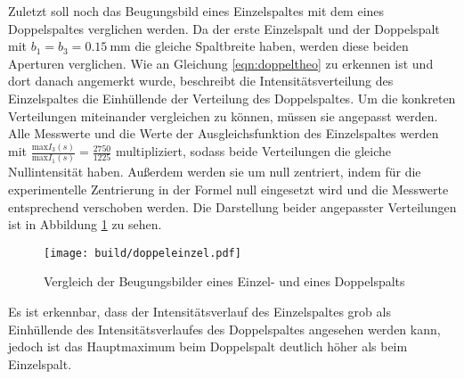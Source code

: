 Zuletzt soll noch das Beugungsbild eines Einzelspaltes mit dem eines Doppelspaltes
verglichen werden. Da der erste Einzelspalt und der Doppelspalt mit $b_1 = b_3 = \SI{0.15}{\milli\meter}$
die gleiche Spaltbreite haben, werden diese beiden Aperturen verglichen.
Wie an Gleichung \eqref{eqn:doppeltheo} zu erkennen ist und dort danach angemerkt
wurde, beschreibt die Intensitätsverteilung des Einzelspaltes die Einhüllende
der Verteilung des Doppelspaltes. Um die konkreten Verteilungen miteinander vergleichen
zu können, müssen sie angepasst werden. Alle Messwerte und die Werte der Ausgleichsfunktion
des Einzelspaltes werden mit $\frac{\text{max} I_3(s)}{\text{max} I_1(s)} = \frac{2750}{1225}$
multipliziert, sodass beide Verteilungen die gleiche Nullintensität haben. Außerdem
werden sie um null zentriert, indem für die experimentelle Zentrierung in der Formel
null eingesetzt wird und die Messwerte entsprechend verschoben werden.
Die Darstellung beider angepasster Verteilungen ist in Abbildung \ref{fig:doppeleinzel}
zu sehen.

\begin{figure}
  \centering
  \texttt{[image: build/doppeleinzel.pdf]}
  \caption{Vergleich der Beugungsbilder eines Einzel- und eines Doppelspalts}
  \label{fig:doppeleinzel}
\end{figure}

Es ist erkennbar, dass der Intensitätsverlauf des Einzelspaltes grob als Einhüllende
des Intensitätsverlaufes des Doppelspaltes angesehen werden kann, jedoch ist das Hauptmaximum
beim Doppelspalt deutlich höher als beim Einzelspalt.
